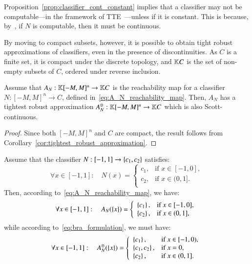 \documentclass[11pt,times]{article}
\begin{document}
Proposition~\ref{prop:classifier_cont_constant} implies that a
classifier may not be computable---in the framework of
\ac{TTE}~\parencite{Weihrauch2000:book}---unless if it is
constant. This is because, by~\parencite[Theorem~2.13]{Ko91-book}, if
$N$ is computable, then it must be continuous.

By moving to compact subsets, however, it is possible to obtain tight
robust approximations of classifiers, even in the presence of
discontinuities. As $C$ is a finite set, it is compact under the
discrete topology, and $\mathbb{K}C$ is the set of non-empty subsets of
$C$, ordered under reverse inclusion.


\begin{theorem}
  \label{thm:classifiers_tightest_robust}
  Assume that $A_N : \mathbb{K}[-M,M]^n \to \mathbb{K}C$ is the reachability
  map for a classifier $N: [-M,M]^n \to C$, defined
  in~\eqref{eq:A_N_reachability_map}. Then, $A_N$ has a tightest
  robust approximation $A_N^\circledcirc : \mathbb{K}[-M,M]^n \to \mathbb{K}C$
  which is also Scott-continuous.
\end{theorem}

\begin{proof}
  Since both $[-M,M]^n$ and $C$ are compact, the result follows from
  Corollary~\ref{cor:tightest_robust_approximation}.
\end{proof}


\begin{example}
  \label{example:classifier_bra}
  Assume that the classifier $N: [-1,1] \to \left\{{c_1, c_2}\right\}$ satisfies:
  \begin{equation*}
    \forall x \in [-1,1]: \quad N(x) = \left\{
      \begin{array}{ll}
        c_1, & \text{if } x \in [-1,0],\\
        c_2, & \text{if } x \in (0,1].\\
      \end{array}
      \right.
    \end{equation*}
    Then, according to~\eqref{eq:A_N_reachability_map}, we have:
  \begin{equation*}
    \forall x \in [-1,1]: \quad A_N(\left\{{x}\right\}) = \left\{
      \begin{array}{ll}
        \left\{{c_1}\right\}, & \text{if } x \in [-1,0],\\
        \left\{{c_2}\right\}, & \text{if } x \in (0,1],\\
      \end{array}
      \right.
    \end{equation*}
    while according to~\eqref{eq:bra_formulation}, we must have:
  \begin{equation*}
    \forall x \in [-1,1]: \quad A_N^\circledcirc(\left\{{x}\right\}) = \left\{
      \begin{array}{ll}
        \left\{{c_1}\right\}, & \text{if } x \in [-1,0),\\
        \left\{{c_1,c_2}\right\}, & \text{if } x = 0,\\
        \left\{{c_2}\right\}, & \text{if } x \in (0,1].\\
      \end{array}
      \right.
    \end{equation*}
\end{example}
\end{document}
